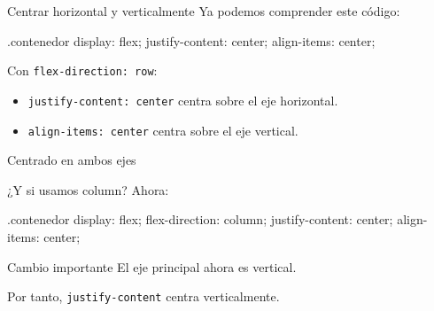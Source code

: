 \documentclass[aspectratio=169,11.5pt]{beamer}
\begin{document}
    \begin{frame}[fragile]{Centrar horizontal y verticalmente}
        Ya podemos comprender este código:

        \begin{csscodedark}
            .contenedor {
                display: flex;
                justify-content: center;
                align-items: center;
            }
        \end{csscodedark}

        Con \texttt{flex-direction: row}:

        \begin{itemize}
            \item \texttt{justify-content: center}
            centra sobre el eje horizontal.
            \item \texttt{align-items: center}
            centra sobre el eje vertical.
        \end{itemize}
    \end{frame}

    \begin{frame}{Centrado en ambos ejes}
        \begin{center}
        \end{center}
    \end{frame}

    \begin{frame}[fragile]{¿Y si usamos column?}
        Ahora:

        \begin{csscodedark}
            .contenedor {
                display: flex;
                flex-direction: column;
                justify-content: center;
                align-items: center;
            }
        \end{csscodedark}

        \begin{block}{Cambio importante}
            El eje principal ahora es vertical.

            Por tanto, \texttt{justify-content}
            centra verticalmente.
        \end{block}
    \end{frame}
\end{document}
